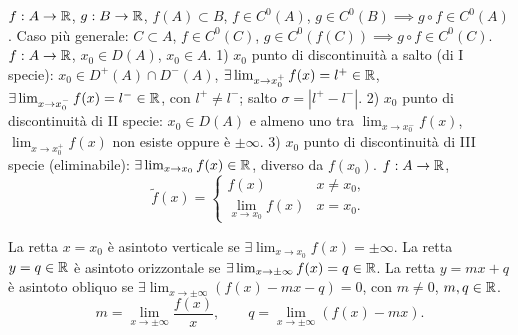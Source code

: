 $f:A\to\mathbb R$, $g:B\to\mathbb R$, $f(A)\subset B$, $f\in C^0(A)$, $g\in C^0(B)\implies g\circ f\in C^0(A)$.
Caso più generale: $C\subset A$, $f\in C^0(C)$, $g\in C^0(f(C))\implies g\circ f\in C^0(C)$.
$f:A\to\mathbb R$, $x_0\in D(A)$, $x_0\in A$.
1) $x_0$ punto di discontinuità a salto (di I specie):
$x_0\in D^+(A)\cap D^-(A)$,
$\exists\lim_{x\to x_0^+}f(x)=l^+\in\mathbb R$, $\exists\lim_{x\to x_0^-}f(x)=l^-\in\mathbb R$, con $l^+\ne l^-$; salto $\sigma=|l^+-l^-|$.
2) $x_0$ punto di discontinuità di II specie: $x_0\in D(A)$ e almeno uno tra $\lim_{x\to x_0^-}f(x)$, $\lim_{x\to x_0^+}f(x)$ non esiste oppure è $\pm\infty$.
3) $x_0$ punto di discontinuità di III specie (eliminabile): $\exists\lim_{x\to x_0}f(x)\in\mathbb R$, diverso da $f(x_0)$.
$f:A\to\mathbb R$,
\[\widetilde f(x)=\begin{cases}f(x)&x\ne x_0,\\\lim_{x\to x_0}f(x)&x=x_0.\end{cases}\]
\begin{center}\quad{}\end{center}
La retta $x=x_0$ è asintoto verticale se $\exists\lim_{x\to x_0}f(x)=\pm\infty$.
La retta $y=q\in\mathbb R$ è asintoto orizzontale se $\exists\lim_{x\to\pm\infty}f(x)=q\in\mathbb R$.
La retta $y=mx+q$ è asintoto obliquo se $\exists\lim_{x\to\pm\infty}(f(x)-mx-q)=0$, con $m\ne0$, $m,q\in\mathbb R$.
\[m=\lim_{x\to\pm\infty}\frac{f(x)}x,\qquad q=\lim_{x\to\pm\infty}(f(x)-mx).\]
